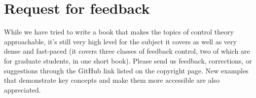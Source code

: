 \section{Request for feedback}

While we have tried to write a book that makes the topics of control theory
approachable, it's still very high level for the subject it covers as well as
very dense and fast-paced (it covers three classes of feedback control, two of
which are for graduate students, in one short book). Please send us feedback,
corrections, or suggestions through the GitHub link listed on the copyright
page. New examples that demonstrate key concepts and make them more accessible
are also appreciated.
